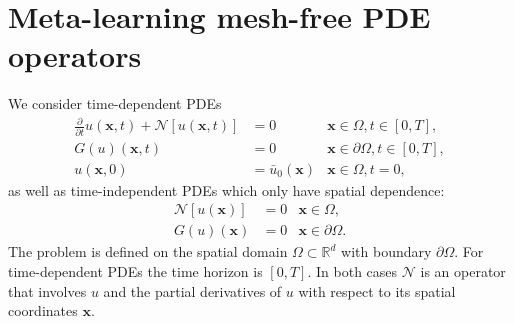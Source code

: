 \section{Meta-learning mesh-free PDE operators}
We consider time-dependent PDEs
\begin{align}
\frac{\partial}{\partial t}u(\bm{x}, t) + \mathcal{N}\left[ u(\bm{x}, t)\right] &= 0 &\bm{x} \in \Omega, t \in [0, T], \label{eq:metapde-time-strongform} \\
G(u)(\bm{x}, t) &= 0 & \bm{x} \in \partial\Omega, t \in [0, T], \label{eq:metapde-time-bc} \\
u(\bm{x}, 0) &= \bar{u}_0(\bm{x}) &\bm{x} \in \Omega, t=0, \label{eq:metapde-time-ic} 
\end{align}
as well as time-independent PDEs which only have spatial dependence:
\begin{align}
\mathcal{N}\left[ u(\bm{x})\right] &= 0 & \bm{x} \in \Omega, \label{eq:metapde-space-strongform} \\
G(u)(\bm{x}) &= 0 & \bm{x} \in \partial\Omega. \label{eq:metapde-space-bc}
\end{align}
The problem is defined on the spatial domain $\Omega \subset \mathbb{R}^{d}$ with boundary $\partial \Omega$. For time-dependent PDEs the time horizon is $[0, T]$. 
In both cases $\mathcal{N}$ is an operator that involves $u$ and the partial derivatives of $u$ with respect to its spatial coordinates $\bm{x}$.


